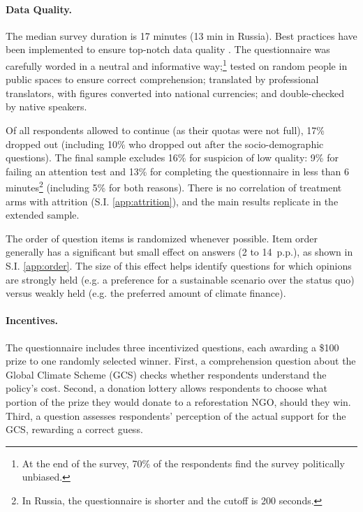 \documentclass[12pt,english]{article}
\begin{document}
\begin{bibunit}
\paragraph{Data Quality.}\label{par:data_quality}
The median survey duration is 17 minutes (13 min in Russia).
Best practices have been implemented to ensure top-notch data quality \citep{stantcheva_how_2023}.
The questionnaire was carefully worded in a neutral and informative way;\footnote{At the end of the survey, 70\% of the respondents find the survey politically unbiased. %
} tested on random people in public spaces to ensure correct comprehension; translated by professional translators, with figures converted into national currencies; and double-checked by native speakers.

Of all respondents allowed to continue (as their quotas were not full), 17\% dropped out (including 10\% who dropped out after the socio-demographic questions). The final sample excludes 16\% for suspicion of low quality: 9\% for failing an attention test and 13\% for completing the questionnaire in less than 6 minutes\footnote{%
In Russia, the questionnaire is shorter and the cutoff is 200 seconds. %
} (including 5\% for both reasons).
There is no correlation of treatment arms with attrition (S.I. \ref{app:attrition}), and the main results replicate in the extended sample. %

The order of question items is randomized whenever possible. Item order generally has a significant but small effect on answers (2 to 14~p.p.), as shown in S.I. \ref{app:order}. The size of this effect helps identify questions for which opinions are strongly held (e.g. a preference for a sustainable scenario over the status quo) versus weakly held (e.g. the preferred amount of climate finance).

\paragraph{Incentives.}
The questionnaire includes three incentivized questions, each awarding a \$100 prize to one randomly selected winner. First, a comprehension question about the Global Climate Scheme (GCS) checks whether respondents understand the policy's cost.
Second, a donation lottery allows respondents to choose what portion of the prize they would donate to a reforestation NGO, should they win. Third, a question assesses respondents' perception of the actual support for the GCS, rewarding a correct guess.


\end{bibunit}
\end{document}

